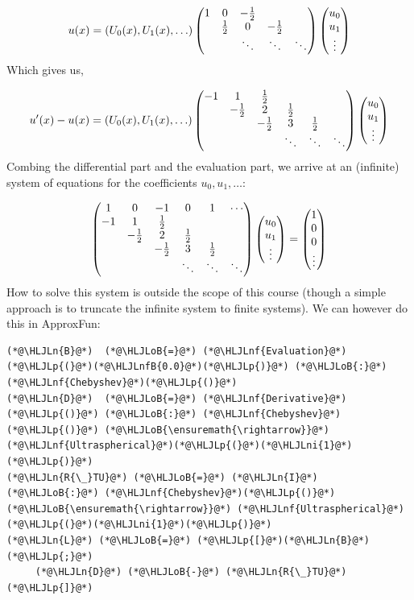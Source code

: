 \documentclass[12pt,a4paper]{article}
\newcommand{\HLJLn}[1]{#1}
\newcommand{\HLJLnf}[1]{\textcolor[RGB]{66,102,213}{#1}}
\newcommand{\HLJLnfB}[1]{\textcolor[RGB]{59,151,46}{#1}}
\newcommand{\HLJLni}[1]{\textcolor[RGB]{59,151,46}{#1}}
\newcommand{\HLJLoB}[1]{\textcolor[RGB]{102,102,102}{\textbf{#1}}}
\newcommand{\HLJLp}[1]{#1}
\begin{document}
\[
u(x) = (U_0(x),U_1(x),\ldots) \begin{pmatrix}
    1 &0 & -{1 \over 2} \cr
& {1 \over 2} & 0 & -{1 \over 2} \cr
&&\ddots & \ddots & \ddots
\end{pmatrix}\begin{pmatrix} u_0\\u_1\\\vdots \end{pmatrix}
\]
Which gives us,

\[
u'(x) - u(x) =  (U_0(x),U_1(x),\ldots)  \begin{pmatrix}
    -1 &1 & {1 \over 2} \cr
& -{1 \over 2} & 2 & {1 \over 2} \cr
&& -{1 \over 2} & 3 & {1 \over 2} \cr
&&&\ddots & \ddots & \ddots
\end{pmatrix} \begin{pmatrix} u_0\\u_1\\\vdots \end{pmatrix}
\]
Combing the differential part and the evaluation part, we arrive at an (infinite) system of equations for the coefficients $u_0,u_1,\dots$:

\[
\begin{pmatrix}
      1 & 0 & -1 & 0 & 1 & \cdots \\
    -1 &1 & {1 \over 2} \cr
& -{1 \over 2} & 2 & {1 \over 2} \cr
&& -{1 \over 2} & 3 & {1 \over 2} \cr
&&&\ddots & \ddots & \ddots
\end{pmatrix} \begin{pmatrix} u_0\\u_1\\\vdots \end{pmatrix}  = \begin{pmatrix} 1 \\ 0 \\ 0 \\ \vdots \end{pmatrix}
\]
How to solve this system is outside the scope of this course (though a simple approach is to truncate the infinite system to finite systems). We can however do this in ApproxFun:


\begin{lstlisting}
(*@\HLJLn{B}@*)  (*@\HLJLoB{=}@*) (*@\HLJLnf{Evaluation}@*)(*@\HLJLp{(}@*)(*@\HLJLnfB{0.0}@*)(*@\HLJLp{)}@*) (*@\HLJLoB{:}@*) (*@\HLJLnf{Chebyshev}@*)(*@\HLJLp{()}@*)
(*@\HLJLn{D}@*)  (*@\HLJLoB{=}@*) (*@\HLJLnf{Derivative}@*)(*@\HLJLp{()}@*) (*@\HLJLoB{:}@*) (*@\HLJLnf{Chebyshev}@*)(*@\HLJLp{()}@*) (*@\HLJLoB{\ensuremath{\rightarrow}}@*) (*@\HLJLnf{Ultraspherical}@*)(*@\HLJLp{(}@*)(*@\HLJLni{1}@*)(*@\HLJLp{)}@*)
(*@\HLJLn{R{\_}TU}@*) (*@\HLJLoB{=}@*) (*@\HLJLn{I}@*) (*@\HLJLoB{:}@*) (*@\HLJLnf{Chebyshev}@*)(*@\HLJLp{()}@*) (*@\HLJLoB{\ensuremath{\rightarrow}}@*) (*@\HLJLnf{Ultraspherical}@*)(*@\HLJLp{(}@*)(*@\HLJLni{1}@*)(*@\HLJLp{)}@*)
(*@\HLJLn{L}@*) (*@\HLJLoB{=}@*) (*@\HLJLp{[}@*)(*@\HLJLn{B}@*)(*@\HLJLp{;}@*)
     (*@\HLJLn{D}@*) (*@\HLJLoB{-}@*) (*@\HLJLn{R{\_}TU}@*)(*@\HLJLp{]}@*)
\end{lstlisting}
\end{document}
